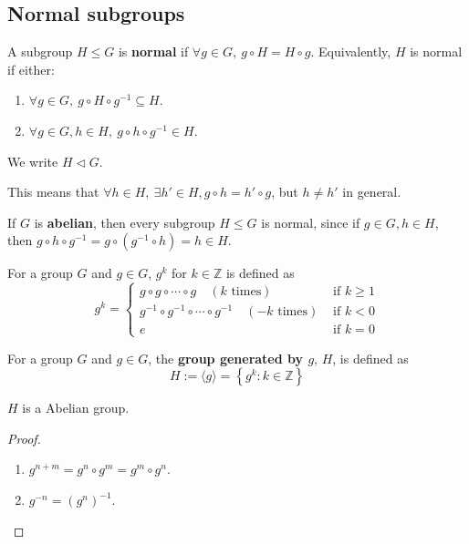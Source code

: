 \subsection{Normal subgroups}

\begin{definition}
	A subgroup $H \le G$ is \textbf{normal} if $\forall g \in G, \ g \circ H = H \circ g$. Equivalently, $H$ is normal if either:
	\begin{enumerate}
		\item $\forall g \in G, \ g \circ H \circ g^{-1} \subseteq H$.
		\item $\forall g \in G, h \in H, \ g \circ h \circ g^{-1} \in H$.
	\end{enumerate}
	We write $H \triangleleft G$.
\end{definition}

\begin{remark}
	This means that $\forall h \in H, \ \exists h' \in H, g \circ h = h' \circ g$, but $h \ne h'$ in general.
\end{remark}

\begin{example}
	If $G$ is \textbf{abelian}, then every subgroup $H \le G$ is normal, since if $g \in G, h \in H$, then $g \circ h \circ g^{-1} = g \circ (g^{-1} \circ h) = h \in H$.
\end{example}

\begin{definition}
	For a group $G$ and $g \in G$, $g^k$ for $k \in \mathbb{Z}$ is defined as
	\[
		g^k = \begin{cases}
			g \circ g \circ \cdots \circ g \quad (k \text{ times}) & \text{ if } k \ge 1 \\
			g^{-1} \circ g^{-1} \circ \cdots \circ g^{-1} \quad (-k \text{ times}) & \text{ if } k < 0 \\
			e & \text{ if } k = 0
		\end{cases}
	\]
\end{definition}

\begin{definition}
	For a group $G$ and $g \in G$, the \textbf{group generated by $g$}, $H$, is defined as
	\[
		H := \langle g \rangle = \left\{ g^k: k \in \mathbb{Z} \right\}
	\]
\end{definition}

\begin{proposition}
	$H$ is a Abelian group.
\end{proposition}

\begin{proof}
	\hfill
	\begin{enumerate}
		\item $g^{n + m} = g^n \circ g^m = g^m \circ g^n$.
		\item $g^{-n} = {\left( g^n \right)}^{-1}$.
	\end{enumerate}
\end{proof}

